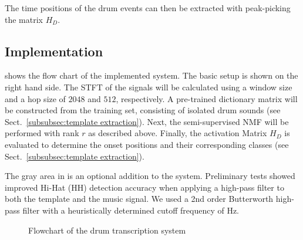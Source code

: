 \documentclass{article}
\begin{document}
The time positions of the drum events can then be extracted with peak-picking the matrix $H_D$.

\subsection{Implementation}\label{subsec:processing steps}

 shows the flow chart of the implemented system. The basic setup is shown on the right hand side. 
The STFT of the signals will be calculated using a window size and a hop size of $2048$ and $512$, respectively. 
A pre-trained dictionary matrix will be constructed from the training set, consisting of isolated drum sounds (see Sect.~\ref{subsubsec:template extraction}). 
Next, the semi-supervised NMF will be performed with rank $r$ as described above. 
Finally, the activation Matrix $H_D$ is evaluated to determine the onset positions and their corresponding classes  (see Sect.~\ref{subsubsec:template extraction}).  

The gray area in  is an optional addition to the system. Preliminary tests showed improved Hi-Hat (HH) detection accuracy when applying a high-pass filter to both the template and the music signal. We used a 2nd order Butterworth high-pass filter with a heuristically determined cutoff frequency of \unit[8000]{Hz}. %

\begin{figure}
 \centerline{}
 \caption{Flowchart of the drum transcription system} %
 \label{fig:flowchart}
\end{figure}
\end{document}
